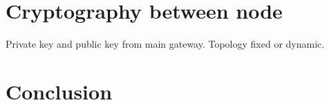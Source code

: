 \documentclass[
	a4paper,
	10pt,
	unnumberedsections,
	twoside,
]{LTJournalArticle}
\begin{document}
\section{Cryptography between node} \label{subsec:node-crypto}
Private key and public key from main gateway. Topology fixed or dynamic.

\section{Conclusion}

\nocite{*}
\printbibliography
\end{document}

